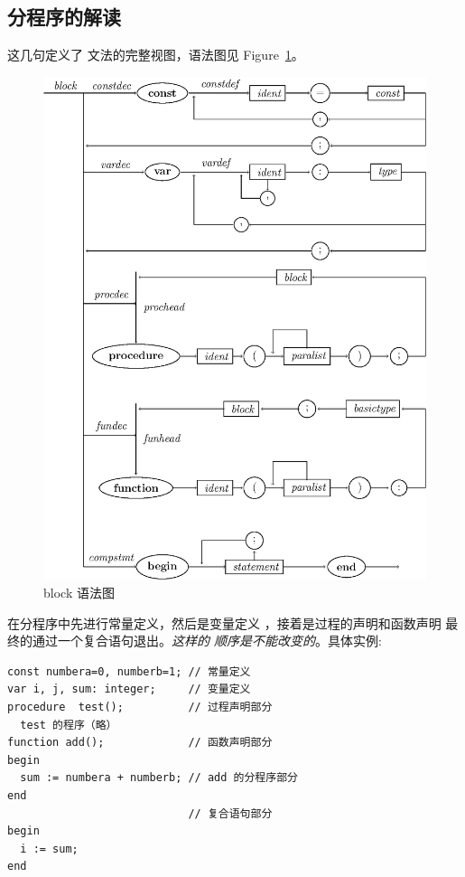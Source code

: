 \subsection{分程序的解读}










这几句定义了  文法的完整视图，语法图见 Figure~\ref{block}。
\begin{figure}[!h]
\begin{center}
    \includegraphics[scale=.8]{Figures/block.eps}
\end{center}
\caption{block 语法图}
\label{block}
\end{figure}
在分程序中先进行常量定义，然后是变量定义
 ，接着是过程的声明和函数声明
最终的通过一个复合语句退出。\emph{这样的
顺序是不能改变的}。具体实例:
\begin{verbatim}
const numbera=0, numberb=1; // 常量定义
var i, j, sum: integer;     // 变量定义
procedure  test();          // 过程声明部分
  test 的程序（略）
function add();             // 函数声明部分
begin
  sum := numbera + numberb; // add 的分程序部分
end
                            // 复合语句部分
begin
  i := sum;
end
\end{verbatim}
